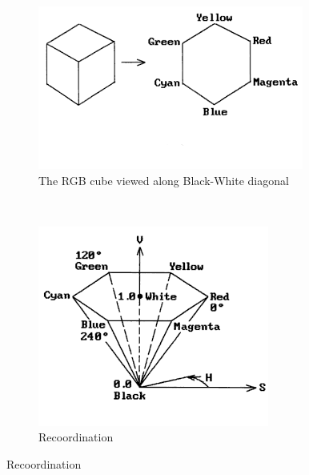 \documentclass{report}
\begin{document}
\begin{figure}[hbtp]
        \centering
        \begin{subfigure}[b]{0.3\textwidth}
                \includegraphics[width=\textwidth]{graphics/hsv_cube.png}
                \caption{The RGB cube viewed along Black-White diagonal}
                \label{fig:gull}
        \end{subfigure}%
        ~
        \begin{subfigure}[b]{0.3\textwidth}
                \includegraphics[width=\textwidth]{graphics/hsv_rescale1.png}
                \caption{Recoordination}

\end{subfigure}
\end{figure}
\end{document}
